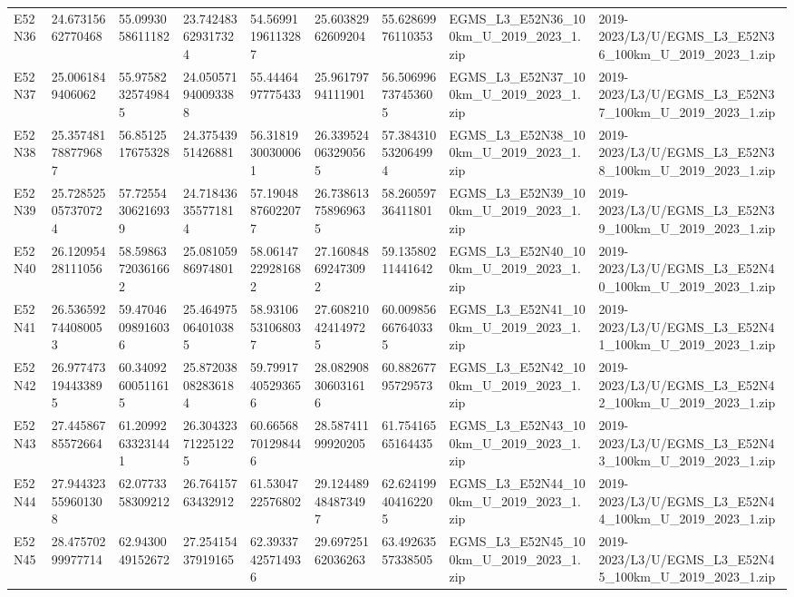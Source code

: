 \begin{landscape}
\begin{longtable}{lllllllll}
E52N36 & 24.67315662770468 & 55.0993058611182 & 23.742483629317324 & 54.56991196113287 & 25.60382962609204 & 55.62869976110353 & EGMS\_L3\_E52N36\_100km\_U\_2019\_2023\_1.zip & 2019-2023/L3/U/EGMS\_L3\_E52N36\_100km\_U\_2019\_2023\_1.zip \\
E52N37 & 25.0061849406062 & 55.97582325749845 & 24.050571940093388 & 55.4446497775433 & 25.96179794111901 & 56.506996737453605 & EGMS\_L3\_E52N37\_100km\_U\_2019\_2023\_1.zip & 2019-2023/L3/U/EGMS\_L3\_E52N37\_100km\_U\_2019\_2023\_1.zip \\
E52N38 & 25.357481788779687 & 56.8512517675328 & 24.37543951426881 & 56.31819300300061 & 26.339524063290565 & 57.384310532064994 & EGMS\_L3\_E52N38\_100km\_U\_2019\_2023\_1.zip & 2019-2023/L3/U/EGMS\_L3\_E52N38\_100km\_U\_2019\_2023\_1.zip \\
E52N39 & 25.728525057370724 & 57.72554306216939 & 24.718436355771814 & 57.19048876022077 & 26.738613758969635 & 58.26059736411801 & EGMS\_L3\_E52N39\_100km\_U\_2019\_2023\_1.zip & 2019-2023/L3/U/EGMS\_L3\_E52N39\_100km\_U\_2019\_2023\_1.zip \\
E52N40 & 26.12095428111056 & 58.59863720361662 & 25.08105986974801 & 58.06147229281682 & 27.160848692473092 & 59.13580211441642 & EGMS\_L3\_E52N40\_100km\_U\_2019\_2023\_1.zip & 2019-2023/L3/U/EGMS\_L3\_E52N40\_100km\_U\_2019\_2023\_1.zip \\
E52N41 & 26.536592744080053 & 59.47046098916036 & 25.464975064010385 & 58.93106531068037 & 27.608210424149725 & 60.009856667640335 & EGMS\_L3\_E52N41\_100km\_U\_2019\_2023\_1.zip & 2019-2023/L3/U/EGMS\_L3\_E52N41\_100km\_U\_2019\_2023\_1.zip \\
E52N42 & 26.977473194433895 & 60.34092600511615 & 25.872038082836184 & 59.79917405293656 & 28.082908306031616 & 60.88267795729573 & EGMS\_L3\_E52N42\_100km\_U\_2019\_2023\_1.zip & 2019-2023/L3/U/EGMS\_L3\_E52N42\_100km\_U\_2019\_2023\_1.zip \\
E52N43 & 27.44586785572664 & 61.20992633231441 & 26.304323712251225 & 60.66568701298446 & 28.58741199920205 & 61.75416565164435 & EGMS\_L3\_E52N43\_100km\_U\_2019\_2023\_1.zip & 2019-2023/L3/U/EGMS\_L3\_E52N43\_100km\_U\_2019\_2023\_1.zip \\
E52N44 & 27.944323559601308 & 62.0773358309212 & 26.76415763432912 & 61.5304722576802 & 29.124489484873497 & 62.624199404162205 & EGMS\_L3\_E52N44\_100km\_U\_2019\_2023\_1.zip & 2019-2023/L3/U/EGMS\_L3\_E52N44\_100km\_U\_2019\_2023\_1.zip \\
E52N45 & 28.47570299977714 & 62.9430049152672 & 27.25415437919165 & 62.39337425714936 & 29.69725162036263 & 63.49263557338505 & EGMS\_L3\_E52N45\_100km\_U\_2019\_2023\_1.zip & 2019-2023/L3/U/EGMS\_L3\_E52N45\_100km\_U\_2019\_2023\_1.zip \\

\end{longtable}
\end{landscape}
